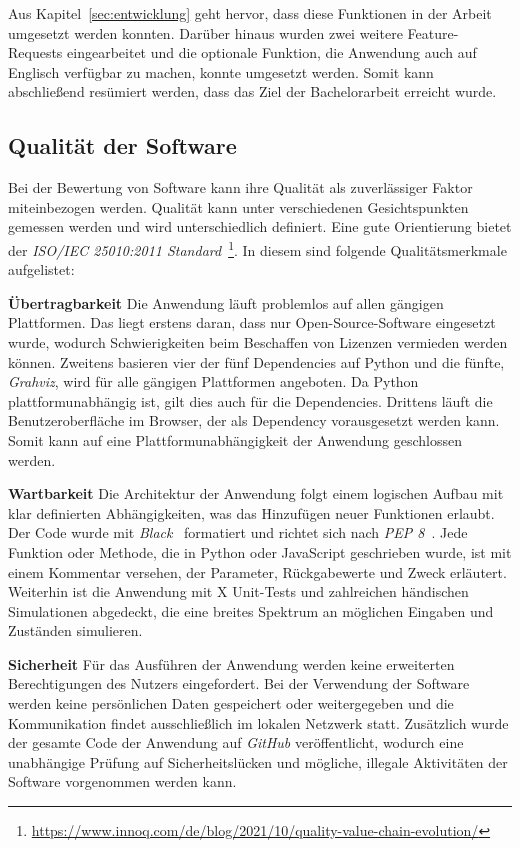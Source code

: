 Aus Kapitel~\ref{sec:entwicklung} geht hervor, dass diese Funktionen in der Arbeit umgesetzt werden konnten. Darüber hinaus wurden zwei weitere Feature-Requests eingearbeitet und 
die optionale Funktion, die Anwendung auch auf Englisch verfügbar zu machen, konnte umgesetzt werden.
Somit kann abschließend resümiert werden, dass das Ziel der Bachelorarbeit erreicht wurde.

\subsection{Qualität der Software}\label{softwarequalität}

Bei der Bewertung von Software kann ihre Qualität als zuverlässiger Faktor miteinbezogen werden. Qualität kann unter verschiedenen Gesichtspunkten gemessen werden und wird
unterschiedlich definiert. Eine gute Orientierung bietet der \textit{ISO/IEC 25010:2011 Standard}~\footnote{\hspace{1.5mm}\url{https://www.innoq.com/de/blog/2021/10/quality-value-chain-evolution/}}. 
In diesem sind folgende Qualitätsmerkmale aufgelistet:

\noindent\textbf{Übertragbarkeit} Die Anwendung läuft problemlos auf allen gängigen Plattformen. Das liegt erstens daran, dass nur Open-Source-Software eingesetzt wurde,
wodurch Schwierigkeiten beim Beschaffen von Lizenzen vermieden werden können. 
Zweitens basieren vier der fünf Dependencies auf Python und die fünfte, \textit{Grahviz}, wird für alle gängigen Plattformen angeboten. Da Python plattformunabhängig ist, gilt dies auch
für die Dependencies.
Drittens läuft die Benutzeroberfläche im Browser, der als Dependency vorausgesetzt werden kann.
Somit kann auf eine Plattformunabhängigkeit der Anwendung geschlossen werden.

\noindent\textbf{Wartbarkeit} Die Architektur der Anwendung folgt einem logischen Aufbau mit klar definierten Abhängigkeiten, was das Hinzufügen neuer Funktionen erlaubt.
Der Code wurde mit \textit{Black}~\cite{black} formatiert und richtet sich nach \textit{PEP 8}~\cite{pep}. Jede Funktion oder Methode, die in Python oder JavaScript geschrieben wurde, 
ist mit einem Kommentar versehen, der Parameter, Rückgabewerte und Zweck erläutert. Weiterhin ist die Anwendung mit X Unit-Tests und zahlreichen händischen Simulationen abgedeckt, die eine breites Spektrum an 
möglichen Eingaben und Zuständen simulieren.

\noindent\textbf{Sicherheit} Für das Ausführen der Anwendung werden keine erweiterten Berechtigungen des Nutzers eingefordert. Bei der Verwendung der Software werden keine persönlichen Daten gespeichert 
oder weitergegeben und die Kommunikation findet ausschließlich im lokalen Netzwerk statt.
Zusätzlich wurde der gesamte Code der Anwendung auf \textit{GitHub} veröffentlicht, wodurch eine unabhängige Prüfung auf Sicherheitslücken und mögliche, illegale Aktivitäten der Software vorgenommen werden kann.

